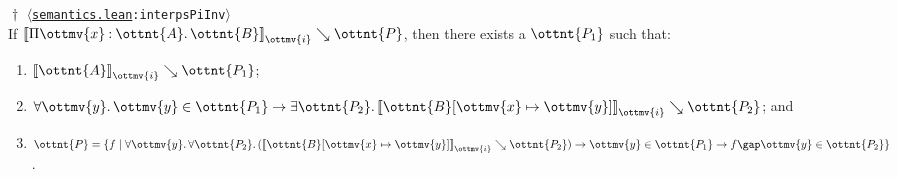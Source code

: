\documentclass[a4paper,UKenglish,cleveref,autoref,thm-restate]{lipics-v2021}
\newcommand{\repo}{https://github.com/ionathanch/TTBFL}
\newcommand{\thmref}[2]{%
  $\langle$\href{\repo/tree/main/src/#1}{\texttt{#1}}\texttt{:#2}$\rangle$%
}
\begin{document}
\begin{lemma}$\!\!{\dagger}$ \thmref{semantics.lean}{interpsPiInv} \label{lem:lr:inv-pi} \\
  If $ \mathopen{\llbracket}   \Pi  \ottmv{x}  \mathbin{:}  \ottnt{A}  \mathpunct{.}  \ottnt{B}   \mathclose{\rrbracket}_{ \ottmv{i} } \searrow  \ottnt{P} $,
  then there exists a $\ottnt{P_{{\mathrm{1}}}}$ such that:
  \begin{enumerate}[topsep=0pt]
    \item \label{lem:inv-pi:goal:A} $ \mathopen{\llbracket}  \ottnt{A}  \mathclose{\rrbracket}_{ \ottmv{i} } \searrow  \ottnt{P_{{\mathrm{1}}}} $;
    \item \label{lem:inv-pi:goal:B} $   \forall  \ottmv{y}  \mathpunct{.}  \ottmv{y}   \in  \ottnt{P_{{\mathrm{1}}}}   \to   \exists  \ottnt{P_{{\mathrm{2}}}}  \mathpunct{.}   \mathopen{\llbracket}   \ottnt{B} [  \ottmv{x}  \mapsto  \ottmv{y}  ]   \mathclose{\rrbracket}_{ \ottmv{i} } \searrow  \ottnt{P_{{\mathrm{2}}}}   $; and
    \item \label{lem:inv-pi:goal:P} $\ottnt{P} =  \lbrace  f  \mid   \forall  \ottmv{y}  \mathpunct{.}     \forall  \ottnt{P_{{\mathrm{2}}}}  \mathpunct{.}   (  \mathopen{\llbracket}   \ottnt{B} [  \ottmv{x}  \mapsto  \ottmv{y}  ]   \mathclose{\rrbracket}_{ \ottmv{i} } \searrow  \ottnt{P_{{\mathrm{2}}}}  )    \to   \ottmv{y}  \in  \ottnt{P_{{\mathrm{1}}}}    \to    f  \gap  \ottmv{y}   \in  \ottnt{P_{{\mathrm{2}}}}     \rbrace $.
  \end{enumerate}
\end{lemma}
\end{document}
